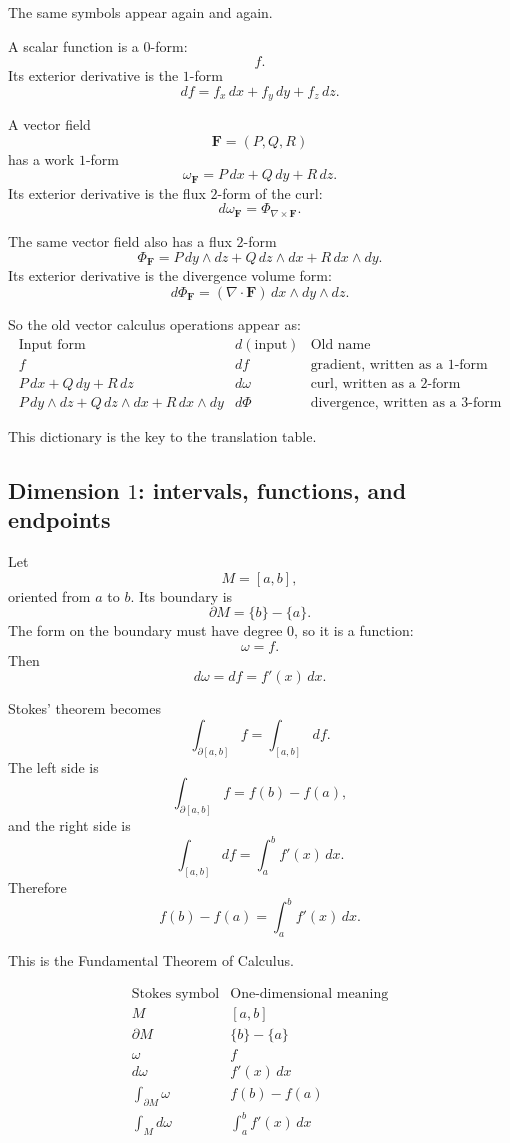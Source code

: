 The same symbols appear again and again.

A scalar function is a \(0\)-form:
\[
    f.
\]
Its exterior derivative is the \(1\)-form
\[
    df=f_x\,dx+f_y\,dy+f_z\,dz.
\]

A vector field
\[
    \mathbf F=(P,Q,R)
\]
has a work \(1\)-form
\[
\boxed{
    \omega_{\mathbf F}=P\,dx+Q\,dy+R\,dz.
}
\]
Its exterior derivative is the flux \(2\)-form of the curl:
\[
\boxed{
    d\omega_{\mathbf F}
    =
    \Phi_{\nabla\times\mathbf F}.
}
\]

The same vector field also has a flux \(2\)-form
\[
\boxed{
    \Phi_{\mathbf F}
    =
    P\,dy\wedge dz+Q\,dz\wedge dx+R\,dx\wedge dy.
}
\]
Its exterior derivative is the divergence volume form:
\[
\boxed{
    d\Phi_{\mathbf F}
    =
    (\nabla\cdot\mathbf F)\,dx\wedge dy\wedge dz.
}
\]

So the old vector calculus operations appear as:
\[
\begin{array}{c|c|c}
\text{Input form} & d(\text{input}) & \text{Old name} \\ \hline
f & df & \text{gradient, written as a }1\text{-form}\\[1mm]
P\,dx+Q\,dy+R\,dz & d\omega & \text{curl, written as a }2\text{-form}\\[1mm]
P\,dy\wedge dz+Q\,dz\wedge dx+R\,dx\wedge dy & d\Phi & \text{divergence, written as a }3\text{-form}
\end{array}
\]

This dictionary is the key to the translation table.

\subsection{Dimension \(1\): intervals, functions, and endpoints}

Let
\[
    M=[a,b],
\]
oriented from \(a\) to \(b\).  Its boundary is
\[
    \partial M=\{b\}-\{a\}.
\]
The form on the boundary must have degree \(0\), so it is a function:
\[
    \omega=f.
\]
Then
\[
    d\omega=df=f'(x)\,dx.
\]

Stokes' theorem becomes
\[
    \int_{\partial[a,b]} f=\int_{[a,b]}df.
\]
The left side is
\[
    \int_{\partial[a,b]} f=f(b)-f(a),
\]
and the right side is
\[
    \int_{[a,b]}df=\int_a^b f'(x)\,dx.
\]
Therefore
\[
\boxed{
    f(b)-f(a)=\int_a^b f'(x)\,dx.
}
\]

This is the Fundamental Theorem of Calculus.

\[
\begin{array}{c|c}
\text{Stokes symbol} & \text{One-dimensional meaning} \\ \hline
M & [a,b]\\[1mm]
\partial M & \{b\}-\{a\}\\[1mm]
\omega & f\\[1mm]
d\omega & f'(x)\,dx\\[1mm]
\displaystyle\int_{\partial M}\omega & f(b)-f(a)\\[3mm]
\displaystyle\int_M d\omega & \displaystyle\int_a^b f'(x)\,dx
\end{array}
\]

